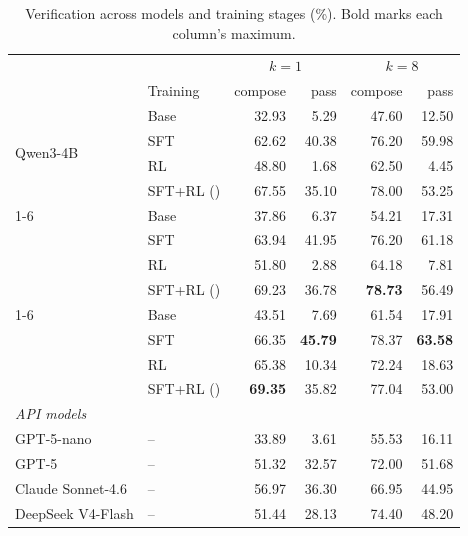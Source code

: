 \begin{table}[!t]
\centering
\small
\begin{tabular}{llrrrr}
\toprule
\rowcolor{algobg}
& & \multicolumn{2}{c}{\(k=1\)} & \multicolumn{2}{c}{\(k=8\)} \\
\headercmidrules{\cmidrule(lr){3-4}\cmidrule(lr){5-6}}
\rowcolor{algobg}
\multirow{-2}{*}{Backbone} & \multirow{-2}{*}{Training} & compose & pass & compose & pass \\
\midrule
\multirow{4}{*}{Qwen3-4B}
 & Base & 32.93 & 5.29 & 47.60 & 12.50 \\
 & SFT & 62.62 & 40.38 & 76.20 & 59.98 \\
 & RL & 48.80 & 1.68 & 62.50 & 4.45 \\
 & SFT+RL (\sam{}) & 67.55 & 35.10 & 78.00 & 53.25 \\
\cmidrule(lr){1-6}
\multirow{4}{*}{Qwen3-8B}
 & Base & 37.86 & 6.37 & 54.21 & 17.31 \\
 & SFT & 63.94 & 41.95 & 76.20 & 61.18 \\
 & RL & 51.80 & 2.88 & 64.18 & 7.81 \\
 & SFT+RL (\sam{}) & 69.23 & 36.78 & \textbf{78.73} & 56.49 \\
\cmidrule(lr){1-6}
\multirow{4}{*}{Qwen3-14B}
 & Base & 43.51 & 7.69 & 61.54 & 17.91 \\
 & SFT & 66.35 & \textbf{45.79} & 78.37 & \textbf{63.58} \\
 & RL & 65.38 & 10.34 & 72.24 & 18.63 \\
 & SFT+RL (\sam{}) & \textbf{69.35} & 35.82 & 77.04 & 53.00 \\
\midrule
\multicolumn{6}{l}{\textit{API models}} \\
GPT-5-nano & -- & 33.89 & 3.61 & 55.53 & 16.11 \\
GPT-5 & -- & 51.32 & 32.57 & 72.00 & 51.68 \\
Claude Sonnet-4.6 & -- & 56.97 & 36.30 & 66.95 & 44.95 \\
DeepSeek V4-Flash & -- & 51.44 & 28.13 & 74.40 & 48.20 \\
\bottomrule
\end{tabular}
\caption{Verification across models and training stages (\%). Bold marks each column's maximum.}
\label{tab:rcf-paired}
\end{table}

